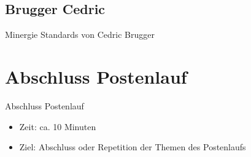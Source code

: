 \subsection{Brugger Cedric}
\begin{frame}{Minergie Standards}
    von Cedric Brugger
\end{frame}



\section{Abschluss Postenlauf}
\BlueSectionSlide


\begin{frame}{Abschluss Postenlauf}
    \begin{itemize}
        \item[\textbullet] Zeit: ca. 10 Minuten
        \item[\textbullet] Ziel: Abschluss oder Repetition der Themen des Postenlaufs
    \end{itemize}

\end{frame}






